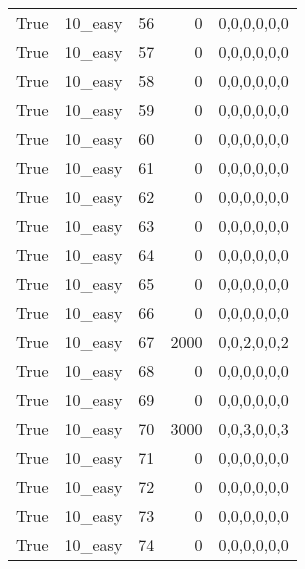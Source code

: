 \begin{tabular}{llrrl}
 True            & 10\_easy             &            56 &                     0 & 0,0,0,0,0,0   \\
 True            & 10\_easy             &            57 &                     0 & 0,0,0,0,0,0   \\
 True            & 10\_easy             &            58 &                     0 & 0,0,0,0,0,0   \\
 True            & 10\_easy             &            59 &                     0 & 0,0,0,0,0,0   \\
 True            & 10\_easy             &            60 &                     0 & 0,0,0,0,0,0   \\
 True            & 10\_easy             &            61 &                     0 & 0,0,0,0,0,0   \\
 True            & 10\_easy             &            62 &                     0 & 0,0,0,0,0,0   \\
 True            & 10\_easy             &            63 &                     0 & 0,0,0,0,0,0   \\
 True            & 10\_easy             &            64 &                     0 & 0,0,0,0,0,0   \\
 True            & 10\_easy             &            65 &                     0 & 0,0,0,0,0,0   \\
 True            & 10\_easy             &            66 &                     0 & 0,0,0,0,0,0   \\
 True            & 10\_easy             &            67 &                  2000 & 0,0,2,0,0,2   \\
 True            & 10\_easy             &            68 &                     0 & 0,0,0,0,0,0   \\
 True            & 10\_easy             &            69 &                     0 & 0,0,0,0,0,0   \\
 True            & 10\_easy             &            70 &                  3000 & 0,0,3,0,0,3   \\
 True            & 10\_easy             &            71 &                     0 & 0,0,0,0,0,0   \\
 True            & 10\_easy             &            72 &                     0 & 0,0,0,0,0,0   \\
 True            & 10\_easy             &            73 &                     0 & 0,0,0,0,0,0   \\
 True            & 10\_easy             &            74 &                     0 & 0,0,0,0,0,0   \\

\end{tabular}
